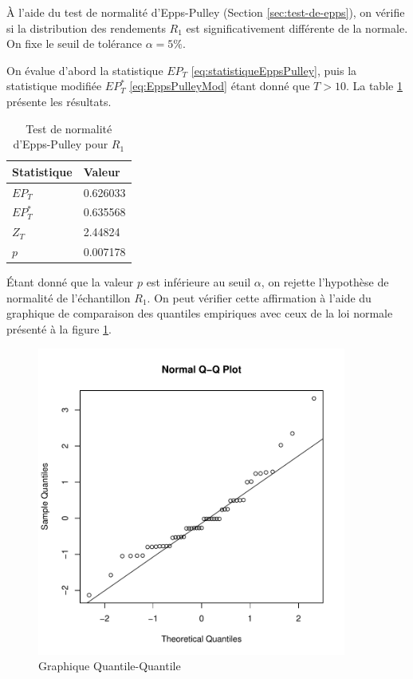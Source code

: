 À l'aide du test de normalité d'Epps-Pulley (Section
\ref{sec:test-de-epps}), on vérifie si la distribution des rendements
$R_1$ est significativement différente de la normale. On fixe le seuil
de tolérance $\alpha = 5\% $.

On évalue d'abord la statistique $EP_T$
\eqref{eq:statistiqueEppsPulley}, puis la statistique modifiée
$EP_T^{*}$ \eqref{eq:EppsPulleyMod} étant donné que $T>10$. La table
\ref{tab:eppspulleyR1} présente les résultats.

\begin{table}[!ht]
  \centering
  \begin{tabular}{ll}
    \hline
    \textbf{Statistique} & \textbf{Valeur} \\
    \hline
    $EP_T$ & 0.626033 \\
    $EP_T^{*}$ & 0.635568 \\
    $Z_T$ & 2.44824 \\
    $p$ & 0.007178 \\
    \hline
  \end{tabular}
  \caption{Test de normalité d'Epps-Pulley pour $R_1$}
  \label{tab:eppspulleyR1}
\end{table}

Étant donné que la valeur $p$ est inférieure au seuil $\alpha$, on
rejette l'hypothèse de normalité de l'échantillon $R_1$. On peut
vérifier cette affirmation à l'aide du graphique de comparaison des
quantiles empiriques avec ceux de la loi normale présenté à la figure
\ref{fig:qqplotR1}.

\begin{figure}[!ht]
  \centering
  \includegraphics[height=4in,
  width=4in]{./graphiques/ABBEYN-qq.pdf}
  \caption{Graphique Quantile-Quantile}
  \label{fig:qqplotR1}
\end{figure}

